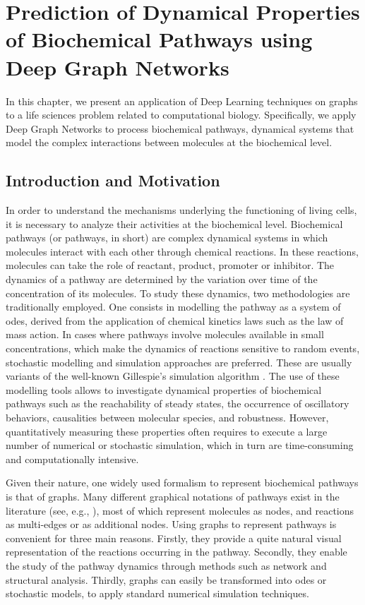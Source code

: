 \chapter{Prediction of Dynamical Properties of Biochemical Pathways using Deep Graph Networks}\label{ch:prediction-biochemical-dgn}

In this chapter, we present an application of Deep Learning techniques on graphs to a life sciences problem related to computational biology. Specifically, we apply Deep Graph Networks to process biochemical pathways, \ie dynamical systems that model the complex interactions between molecules at the biochemical level.

\section{Introduction and Motivation}
In order to understand the mechanisms underlying the functioning of living cells, it is necessary to analyze their activities at the biochemical level. Biochemical pathways (or pathways, in short) are complex dynamical systems in which molecules interact with each other through chemical reactions. In these reactions, molecules can take the role of reactant, product, promoter or inhibitor. The dynamics of a pathway are determined by the variation over time of the concentration of its molecules. To study these dynamics, two methodologies are traditionally employed. One consists in modelling the pathway as a system of \glspl{ode}, derived from the application of chemical kinetics laws such as the law of mass action. In cases where pathways involve molecules available in small concentrations, which make the dynamics of reactions sensitive to random events, stochastic modelling and simulation approaches are preferred. These are usually variants of the well-known Gillespie's simulation algorithm \citep{gillespie1977exact}. The use of these modelling tools allows to investigate dynamical properties of biochemical pathways such as the reachability of steady states, the occurrence of oscillatory behaviors, causalities between molecular species, and robustness. However, quantitatively measuring these properties often requires to execute a large number of numerical or stochastic simulation, which in turn are time-consuming and computationally intensive.

Given their nature, one widely used formalism to represent biochemical pathways is that of graphs. Many different graphical notations of pathways exist in the literature (see, e.g., \citet{karp1994representations,reddy1993petri,le2009systems}), most of which represent molecules as nodes, and reactions as multi-edges or as additional nodes. Using graphs to represent pathways is convenient for three main reasons. Firstly, they provide a quite natural visual representation of the reactions occurring in the pathway. Secondly, they enable the study of the pathway dynamics through methods such as network and structural analysis. Thirdly, graphs can easily be transformed into \glspl{ode} or stochastic models, to apply standard numerical simulation techniques.

